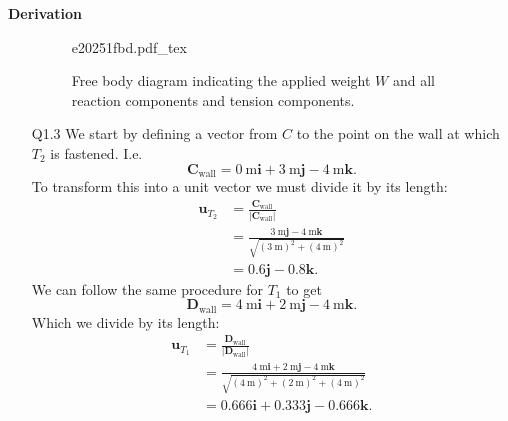 \documentclass[a4paper]{article}
\renewcommand{\Vec}[1]{\boldsymbol{#1}}
\newcommand{\incfig}[2][1]{%
  \def\svgwidth{#1\columnwidth}
  {#2.pdf_tex}
}
\numberwithin{equation}{problem}
\newcommand{\AUheading}[1]{%
  \par\vspace{.4\baselineskip}%
  {\sffamily\bfseries\color{AUblueDark}#1\par}%
  \nobreak%
}
\newenvironment{derivation}[1][Derivation]{%
  \AUheading{#1}
  \begingroup\allowdisplaybreaks
  \setlength{\abovedisplayskip}{6pt}%
  \setlength{\belowdisplayskip}{6pt}%
  \setlength{\abovedisplayshortskip}{4pt}%
  \setlength{\belowdisplayshortskip}{4pt}%
}{\par\endgroup\medskip}
\begin{document}
\begin{derivation}
\begin{itemize}
        \begin{figure}[ht]
            \centering
            \incfig{e20251fbd}
            \caption{Free body diagram indicating the applied weight $W$ and all reaction components and tension components.}
            \label{fig:e20251fbd}
        \end{figure}
      \item[Q1.3] We start by defining a vector from $C$ to the point on the wall at which $T_2$ is fastened. I.e.
        \begin{equation*}
          \Vec{C}_{\mathrm{wall}} = \qty{0}{\m} \Vec{i} + \qty{3}{\m} \Vec{j} - \qty{4}{\m} \Vec{k}
        .\end{equation*}
        To transform this into a unit vector we must divide it by its length:
        \begin{align*}
          \Vec{u}_{T_2} &= \frac{\Vec{C}_{\mathrm{wall}}}{\left| \Vec{C}_{\mathrm{wall}} \right|} \\
          &= \frac{\qty{3}{\m} \Vec{j} - \qty{4}{\m} \Vec{k}}{\sqrt{\left( \qty{3}{\m}  \right)^2 + \left( \qty{4}{\m}  \right)^2}} \\
          &= \num{0,6} \Vec{j} - \num{0,8} \Vec{k}
        .\end{align*}
        We can follow the same procedure for $T_1$ to get
        \begin{equation*}
          \Vec{D}_{\mathrm{wall}} = \qty{4}{\m} \Vec{i} + \qty{2}{\m} \Vec{j} - \qty{4}{\m} \Vec{k}
        .\end{equation*}
        Which we divide by its length:
        \begin{align*}
          \Vec{u}_{T_1} &= \frac{\Vec{D}_{\mathrm{wall}}}{\left| \Vec{D}_{\mathrm{wall}} \right|} \\
          &= \frac{\qty{4}{\m} \Vec{i} + \qty{2}{\m} \Vec{j} - \qty{4}{\m} \Vec{k}}{\sqrt{\left( \qty{4}{\m}  \right)^2 + \left( \qty{2}{\m}  \right)^2 + \left( \qty{4}{\m}  \right)^2}} \\
          &= \num{0,666} \Vec{i} + \num{0,333} \Vec{j} - \num{0,666} \Vec{k}
        .\end{align*}
        

\end{itemize}
\end{derivation}
\end{document}
